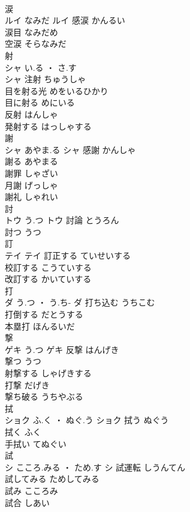 \documentclass[8pt]{extreport}
\begin{document}
\begin{CJK}{UTF8}{min}
\\	涙	
\\	ルイ	なみだ	ルイ	感涙	かんるい	
\\	涙目	なみだめ	
\\	空涙	そらなみだ	
\\	射	
\\	シャ	い.る ・ さ.す
\\	シャ	注射	ちゅうしゃ	
\\	目を射る光	めをいるひかり	
\\	目に射る	めにいる	
\\	反射	はんしゃ	
\\	発射する	はっしゃする	
\\	謝	
\\	シャ	あやま.る	シャ	感謝	かんしゃ	
\\	謝る	あやまる	
\\	謝罪	しゃざい	
\\	月謝	げっしゃ	
\\	謝礼	しゃれい	
\\	討	
\\	トウ	う.つ	トウ	討論	とうろん	
\\	討つ	うつ	
\\	訂	
\\	テイ		テイ	訂正する	ていせいする	
\\	校訂する	こうていする	
\\	改訂する	かいていする	
\\	打	
\\	ダ	う.つ ・ う.ち-	ダ	打ち込む	うちこむ	
\\	打倒する	だとうする	
\\	本塁打	ほんるいだ	
\\	撃	
\\	ゲキ	う.つ	ゲキ	反撃	はんげき	
\\	撃つ	うつ	
\\	射撃する	しゃげきする	
\\	打撃	だげき	
\\	撃ち破る	うちやぶる	
\\	拭	
\\	ショク	ふ.く ・ ぬぐ.う	ショク	拭う	ぬぐう	
\\	拭く	ふく	
\\	手拭い	てぬぐい	
\\	試	
\\	シ	こころ.みる ・ ため.す	シ	試運転	しうんてん	
\\	試してみる	ためしてみる	
\\	試み	こころみ	
\\	試合	しあい	

\end{CJK}
\end{document}
